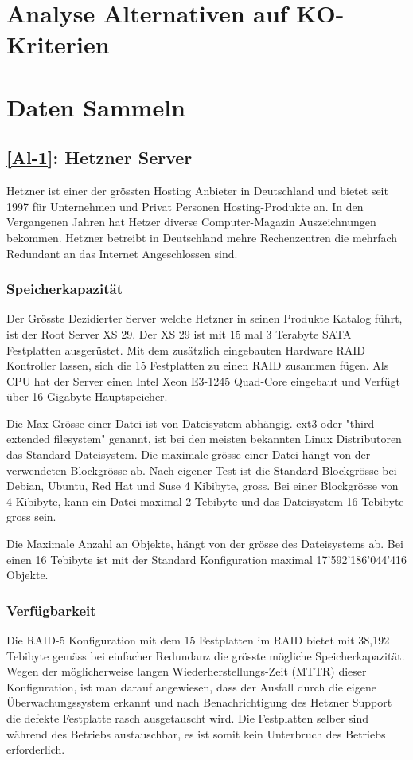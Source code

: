 \section{Analyse Alternativen auf KO-Kriterien}

\section{Daten Sammeln}
\subsection{\ref{Al-1}: Hetzner Server}
Hetzner ist einer der grössten Hosting Anbieter in Deutschland und bietet seit 1997 für Unternehmen und Privat Personen Hosting-Produkte an. In den Vergangenen Jahren hat Hetzer diverse Computer-Magazin Auszeichnungen bekommen. Hetzner betreibt in Deutschland mehre Rechenzentren die mehrfach Redundant an das Internet Angeschlossen sind.

\subsubsection{Speicherkapazität}
Der Grösste Dezidierter Server welche Hetzner in seinen Produkte Katalog führt, ist der Root Server XS 29. Der XS 29 ist mit 15 mal 3 Terabyte SATA Festplatten ausgerüstet. Mit dem zusätzlich eingebauten Hardware RAID Kontroller lassen, sich die 15 Festplatten zu einen RAID zusammen fügen.
Als CPU hat der Server einen Intel Xeon E3-1245 Quad-Core eingebaut und Verfügt über 16 Gigabyte Hauptspeicher. 

Die Max Grösse einer Datei ist von Dateisystem abhängig. ext3 oder "third extended filesystem" genannt, ist bei den meisten bekannten Linux Distributoren das Standard Dateisystem. Die maximale grösse einer Datei hängt von der verwendeten Blockgrösse ab. Nach eigener Test ist die Standard Blockgrösse bei Debian, Ubuntu, Red Hat und Suse 4 Kibibyte, gross. Bei einer Blockgrösse von 4 Kibibyte, kann ein Datei maximal 2 Tebibyte und das Dateisystem 16 Tebibyte gross sein. \cite{Card1993}

Die Maximale Anzahl an Objekte, hängt von der grösse des Dateisystems ab. Bei einen 16 Tebibyte ist mit der Standard Konfiguration maximal 17'592'186'044'416 Objekte. 

\subsubsection{Verfügbarkeit}
Die RAID-5 Konfiguration mit dem 15 Festplatten im RAID bietet mit 38,192 Tebibyte gemäss  bei einfacher Redundanz die grösste mögliche Speicherkapazität. Wegen der möglicherweise langen Wiederherstellungs-Zeit (MTTR) dieser Konfiguration, ist man darauf angewiesen, dass der Ausfall durch die eigene Überwachungssystem erkannt und nach Benachrichtigung des Hetzner Support die defekte Festplatte rasch ausgetauscht wird. Die Festplatten selber sind während des Betriebs austauschbar, es ist somit kein Unterbruch des Betriebs erforderlich.

